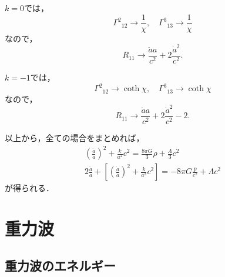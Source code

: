 \documentclass[a4paper]{ltjsreport}
\begin{document}
$k=0$では，
\[{\Gamma^2}_{12}\to\frac{1}{\chi}, \quad{\Gamma^3}_{13}\to\frac{1}{\chi}\]
なので，
\[R_{11}\to\frac{\ddot{a}a}{c^2} + 2\frac{\dot{a}^2}{c^2}.\]

$k= - 1$では，
\[{\Gamma^2}_{12}\to\coth\chi, \quad{\Gamma^3}_{13}\to\coth{\chi}\]
なので，
\[R_{11}\to\frac{\ddot{a}a}{c^2} + 2\frac{\dot{a}^2}{c^2} - 2.\]

以上から，全ての場合をまとめれば，
\begin{align*}
  \left(\frac{\dot{a}}{a}\right)^2 + \frac{k}{a^2}c^2=\frac{8\pi{G}}{3}\rho + \frac{\Lambda}{3}c^2\\
  2\frac{\ddot{a}}{a} + \left[\left(\frac{\dot{a}}{a}\right)^2 + \frac{k}{a^2}c^2\right]= - 8\pi{G}\frac{p}{c^2} + \Lambda{c^2}
\end{align*}
が得られる．

\chapter{重力波}
\setcounter{section}{2}
\section{重力波のエネルギー}
\end{document}
